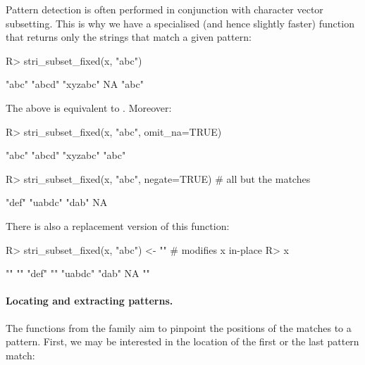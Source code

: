 \documentclass[nojss]{jss}
\begin{document}
\medskip
Pattern detection is often performed in conjunction
with character vector subsetting.
This is why we have a specialised (and hence slightly faster)
function that  returns only the strings that match a given pattern:




\begin{Schunk}
\begin{Sinput}
R> stri_subset_fixed(x, "abc")
\end{Sinput}
\begin{Soutput}
[1] "abc"    "abcd"   "xyzabc" NA       "abc"
\end{Soutput}
\end{Schunk}

The above is equivalent to .
Moreover:

\begin{Schunk}
\begin{Sinput}
R> stri_subset_fixed(x, "abc", omit_na=TRUE)
\end{Sinput}
\begin{Soutput}
[1] "abc"    "abcd"   "xyzabc" "abc"
\end{Soutput}
\begin{Sinput}
R> stri_subset_fixed(x, "abc", negate=TRUE)  # all but the matches
\end{Sinput}
\begin{Soutput}
[1] "def"   "uabdc" "dab"   NA
\end{Soutput}
\end{Schunk}

There is also a replacement version of this function:

\begin{Schunk}
\begin{Sinput}
R> stri_subset_fixed(x, "abc") <- ""  # modifies x in-place
R> x
\end{Sinput}
\begin{Soutput}
[1] ""      ""      "def"   ""      "uabdc" "dab"   NA      ""
\end{Soutput}
\end{Schunk}





\paragraph{Locating and extracting patterns.}
The functions from the  family
aim to pinpoint the positions of the matches to a pattern.
First, we may be interested in the location of the first or the
last pattern match:
\end{document}
